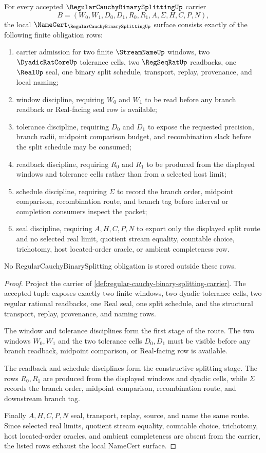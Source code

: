 \begin{theorem}
\label{thm:regular-cauchy-binary-splitting-namecert-obligations}
For every accepted $\RegularCauchyBinarySplittingUp$ carrier
$$
B=(W_0,W_1,D_0,D_1,R_0,R_1,A,\Sigma,H,C,P,N),
$$
the local $\NameCert_{\RegularCauchyBinarySplittingUp}$ surface consists exactly of the following finite obligation rows:
\begin{enumerate}
\item carrier admission for two finite $\StreamNameUp$ windows, two $\DyadicRatCoreUp$ tolerance cells, two $\RegSeqRatUp$ readbacks, one $\RealUp$ seal, one binary split schedule, transport, replay, provenance, and local naming;
\item window discipline, requiring $W_0$ and $W_1$ to be read before any branch readback or Real-facing seal row is available;
\item tolerance discipline, requiring $D_0$ and $D_1$ to expose the requested precision, branch radii, midpoint comparison budget, and recombination slack before the split schedule may be consumed;
\item readback discipline, requiring $R_0$ and $R_1$ to be produced from the displayed windows and tolerance cells rather than from a selected host limit;
\item schedule discipline, requiring $\Sigma$ to record the branch order, midpoint comparison, recombination route, and branch tag before interval or completion consumers inspect the packet;
\item seal discipline, requiring $A,H,C,P,N$ to export only the displayed split route and no selected real limit, quotient stream equality, countable choice, trichotomy, host located-order oracle, or ambient completeness row.
\end{enumerate}
No RegularCauchyBinarySplitting obligation is stored outside these rows.
\end{theorem}
\begin{proof}
Project the carrier of \autoref{def:regular-cauchy-binary-splitting-carrier}. The accepted tuple exposes exactly two finite windows, two dyadic tolerance cells, two regular rational readbacks, one Real seal, one split schedule, and the structural transport, replay, provenance, and naming rows.

The window and tolerance disciplines form the first stage of the route. The two windows $W_0,W_1$ and the two tolerance cells $D_0,D_1$ must be visible before any branch readback, midpoint comparison, or Real-facing row is available.

The readback and schedule disciplines form the constructive splitting stage. The rows $R_0,R_1$ are produced from the displayed windows and dyadic cells, while $\Sigma$ records the branch order, midpoint comparison, recombination route, and downstream branch tag.

Finally $A,H,C,P,N$ seal, transport, replay, source, and name the same route. Since selected real limits, quotient stream equality, countable choice, trichotomy, host located-order oracles, and ambient completeness are absent from the carrier, the listed rows exhaust the local NameCert surface.
\end{proof}

